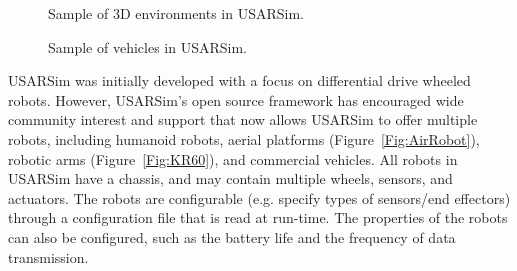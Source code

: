 \begin{figure}[t!]
\centering
{}\qquad
{}
\caption{Sample of 3D environments in USARSim.} \label{3D_World}
\end{figure}
\begin{figure}[t!]
\centering
{}\qquad
{}
\caption{Sample of vehicles in USARSim.}
\end{figure}
USARSim was initially developed with a focus on differential drive wheeled robots. However, USARSim's open source framework has encouraged wide community interest and support that now allows USARSim to offer multiple robots, including humanoid robots, aerial platforms (Figure~\ref{Fig:AirRobot}), robotic arms (Figure~\ref{Fig:KR60}), and commercial vehicles. All robots in USARSim have a chassis, and may contain multiple wheels, sensors, and
actuators. The robots are configurable (e.g. specify types of
sensors/end effectors) through a configuration file that is read at run-time. The properties of the robots can
also be configured, such as the battery life and the frequency of
data transmission.

